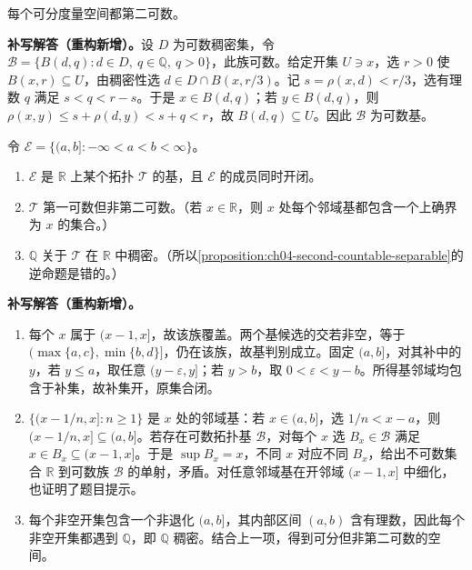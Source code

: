\documentclass[../../main.tex]{subfiles}%
\begin{document}
\begin{exercise}\label{exercise:ch04-separable-metric-second-countable}
每个可分度量空间都第二可数。
\end{exercise}
\begin{solution}
\textbf{补写解答（重构新增）。}设 $D$ 为可数稠密集，令 $\mathcal B=\{B(d,q):d\in D,\ q\in\mathbb Q,\ q>0\}$，此族可数。给定开集 $U\ni x$，选 $r>0$ 使 $B(x,r)\subseteq U$，由稠密性选 $d\in D\cap B(x,r/3)$。记 $s=\rho(x,d)<r/3$，选有理数 $q$ 满足 $s<q<r-s$。于是 $x\in B(d,q)$；若 $y\in B(d,q)$，则 $\rho(x,y)\le s+\rho(d,y)<s+q<r$，故 $B(d,q)\subseteq U$。因此 $\mathcal B$ 为可数基。
\end{solution}
\begin{exercise}\label{exercise:ch04-upper-limit-topology}
令 $\mathcal E=\{(a,b]:-\infty<a<b<\infty\}$。
\begin{enumerate}
\item\label{item:ch04-upper-limit-base} $\mathcal E$ 是 $\mathbb R$ 上某个拓扑 $\mathcal T$ 的基，且 $\mathcal E$ 的成员同时开闭。
\item\label{item:ch04-upper-limit-countability} $\mathcal T$ 第一可数但非第二可数。（若 $x\in\mathbb R$，则 $x$ 处每个邻域基都包含一个上确界为 $x$ 的集合。）
\item\label{item:ch04-upper-limit-density} $\mathbb Q$ 关于 $\mathcal T$ 在 $\mathbb R$ 中稠密。（所以\cref{proposition:ch04-second-countable-separable}的逆命题是错的。）
\end{enumerate}
\end{exercise}
\begin{solution}
\textbf{补写解答（重构新增）。}
\begin{enumerate}
\item 每个 $x$ 属于 $(x-1,x]$，故该族覆盖。两个基候选的交若非空，等于 $(\max\{a,c\},\min\{b,d\}]$，仍在该族，故基判别成立。固定 $(a,b]$，对其补中的 $y$，若 $y\le a$，取任意 $(y-\varepsilon,y]$；若 $y>b$，取 $0<\varepsilon<y-b$。所得基邻域均包含于补集，故补集开，原集合闭。
\item $\{(x-1/n,x]:n\ge1\}$ 是 $x$ 处的邻域基：若 $x\in(a,b]$，选 $1/n<x-a$，则 $(x-1/n,x]\subseteq(a,b]$。若存在可数拓扑基 $\mathcal B$，对每个 $x$ 选 $B_x\in\mathcal B$ 满足 $x\in B_x\subseteq(x-1,x]$。于是 $\sup B_x=x$，不同 $x$ 对应不同 $B_x$，给出不可数集合 $\mathbb R$ 到可数族 $\mathcal B$ 的单射，矛盾。对任意邻域基在开邻域 $(x-1,x]$ 中细化，也证明了题目提示。
\item 每个非空开集包含一个非退化 $(a,b]$，其内部区间 $(a,b)$ 含有理数，因此每个非空开集都遇到 $\mathbb Q$，即 $\mathbb Q$ 稠密。结合上一项，得到可分但非第二可数的空间。
\end{enumerate}
\end{solution}
\end{document}
